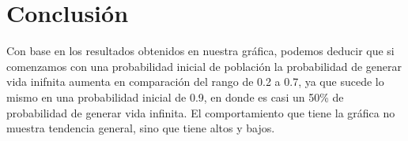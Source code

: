 \documentclass{article}
\begin{document}
\section{Conclusi\'on}

Con base en los resultados obtenidos en nuestra gr\'afica, podemos deducir que si comenzamos con una probabilidad inicial de poblaci\'on la probabilidad de generar vida inifnita aumenta en comparaci\'on del rango de 0.2 a 0.7, ya que sucede lo mismo en una probabilidad inicial de 0.9, en donde es casi un 50\% de probabilidad de generar vida infinita.
El comportamiento que tiene la gr\'afica no muestra tendencia general, sino que tiene altos y bajos.
\bigskip



\end{document}
